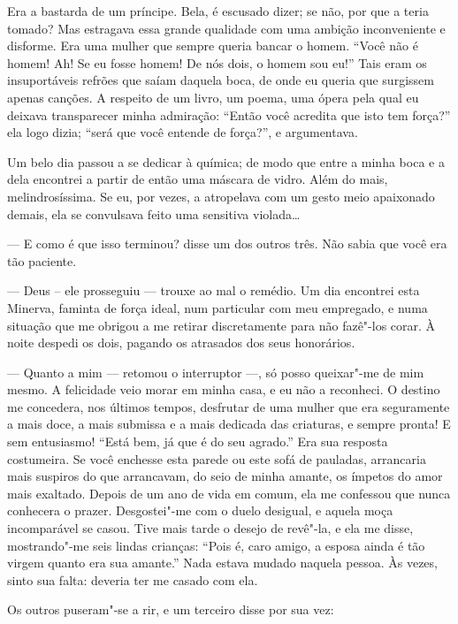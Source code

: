 Era a bastarda de um príncipe. Bela, é escusado dizer; se
não, por que a teria tomado? Mas estragava essa grande qualidade
com uma ambição inconveniente e disforme. Era uma mulher que sempre
queria bancar o homem. “Você não é homem! Ah! Se eu
fosse homem! De nós dois, o homem sou eu!'' Tais eram os
insuportáveis refrões que saíam daquela boca, de onde eu queria que surgissem apenas canções. A respeito de um livro, um poema, uma
ópera pela qual eu deixava transparecer minha admiração:
“Então você acredita que isto tem força?'' ela logo dizia; “será que você
entende de força?'', e argumentava.

Um belo dia passou a se dedicar à química; de modo que
entre a minha boca e a dela encontrei a partir de então uma máscara de vidro.
Além do mais, melindrosíssima. Se eu, por vezes, a atropelava com um
gesto meio apaixonado demais, ela se convulsava feito uma sensitiva
violada\ldots\ 

--- E como é que isso terminou? disse um dos outros três. Não sabia que
você era tão paciente.

--- Deus – ele prosseguiu --- trouxe ao mal o remédio. Um dia encontrei esta
Minerva, faminta de força ideal, num particular com meu empregado, e
numa situação que me obrigou a me retirar discretamente para não
fazê"-los corar. À noite despedi os dois, pagando os atrasados dos seus
honorários.



--- Quanto a mim --- retomou o interruptor ---, só posso queixar"-me de mim
mesmo. A felicidade veio morar em minha casa, e eu não a reconheci. O
destino me concedera, nos últimos tempos, desfrutar de uma
mulher que era seguramente a mais doce, a mais submissa e a mais
dedicada das criaturas, e sempre pronta! E sem entusiasmo!
“Está bem, já que é do seu agrado.'' Era
sua resposta costumeira. Se você enchesse esta parede ou
este sofá de pauladas, arrancaria mais suspiros do que arrancavam, do seio de
minha amante, os ímpetos do amor mais exaltado. Depois de um ano de
vida em comum, ela me confessou que nunca conhecera o prazer.
Desgostei"-me com o duelo desigual, e aquela moça incomparável se
casou. Tive mais tarde o desejo de revê"-la, e ela me disse,
mostrando"-me seis lindas crianças: “Pois é, caro
amigo, a esposa ainda é tão virgem quanto era sua
amante.'' Nada estava mudado naquela pessoa. Às vezes,
sinto sua falta: deveria ter me casado com ela.

Os outros puseram"-se a rir, e um terceiro disse por sua vez:

